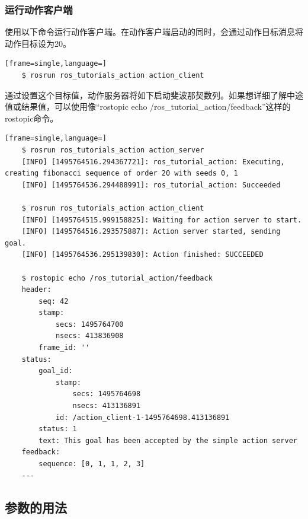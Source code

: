 \documentclass[geye,green,kindle,cn]{elegantnote}
\begin{document}
\subsubsection{运行动作客户端}
使用以下命令运行动作客户端。在动作客户端启动的同时，会通过动作目标消息将动作目标设为20。
\begin{lstlisting}[frame=single,language=]
    $ rosrun ros_tutorials_action action_client
\end{lstlisting}

通过设置这个目标值，动作服务器将如下启动斐波那契数列。如果想详细了解中途 值或结果值，可以使用像“rostopic echo /ros_tutorial_action/feedback”这样的 rostopic命令。 
\begin{lstlisting}[frame=single,language=]
    $ rosrun ros_tutorials_action action_server 
    [INFO] [1495764516.294367721]: ros_tutorial_action: Executing, creating fibonacci sequence of order 20 with seeds 0, 1 
    [INFO] [1495764536.294488991]: ros_tutorial_action: Succeeded 
    
    $ rosrun ros_tutorials_action action_client 
    [INFO] [1495764515.999158825]: Waiting for action server to start. 
    [INFO] [1495764516.293575887]: Action server started, sending goal. 
    [INFO] [1495764536.295139830]: Action finished: SUCCEEDED 
    
    $ rostopic echo /ros_tutorial_action/feedback 
    header:   
        seq: 42   
        stamp:     
            secs: 1495764700     
            nsecs: 413836908   
        frame_id: '' 
    status:   
        goal_id:     
            stamp:       
                secs: 1495764698       
                nsecs: 413136891     
            id: /action_client-1-1495764698.413136891   
        status: 1   
        text: This goal has been accepted by the simple action server 
    feedback:   
        sequence: [0, 1, 1, 2, 3]
    ---
\end{lstlisting}
\subsection{参数的用法}
\end{document}
